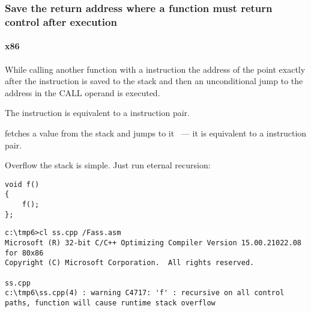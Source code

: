 ﻿\subsubsection{
{Save the return address where a function must return control after execution}}

\paragraph{x86}

{While calling another function with a \CALL instruction the address of the point exactly after the \CALL instruction is saved 
to the stack and then an unconditional jump to the address in the CALL operand is executed.} 

{The \CALL instruction is equivalent to a  instruction pair}.

{\RET fetches a value from the stack and jumps to it ~--- it is equivalent to a  instruction pair.}

\index{\Recursion}
{Overflow the stack is simple. Just run eternal recursion:}

\begin{lstlisting}
void f()
{
	f();
};
\end{lstlisting}


\begin{lstlisting}
c:\tmp6>cl ss.cpp /Fass.asm
Microsoft (R) 32-bit C/C++ Optimizing Compiler Version 15.00.21022.08 for 80x86
Copyright (C) Microsoft Corporation.  All rights reserved.

ss.cpp
c:\tmp6\ss.cpp(4) : warning C4717: 'f' : recursive on all control paths, function will cause runtime stack overflow
\end{lstlisting}

